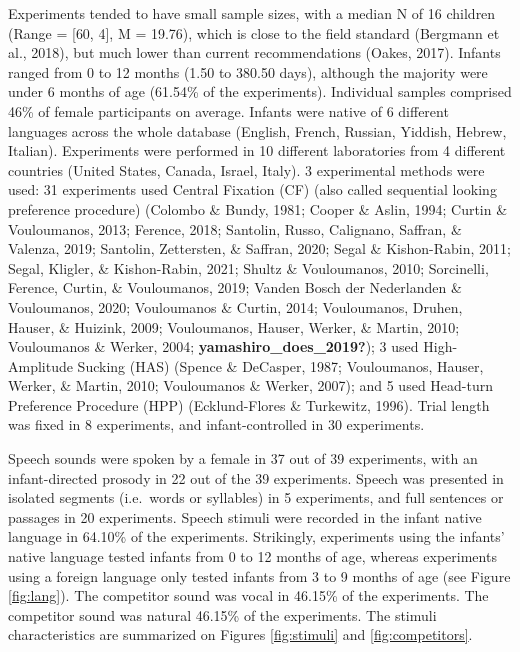 \documentclass[
  english,
  man]{apa6}
\begin{document}
Experiments tended to have small sample sizes, with a median N of 16 children (Range = {[}60, 4{]}, M = 19.76), which is close to the field standard (Bergmann et al., 2018), but much lower than current recommendations (Oakes, 2017). Infants ranged from 0 to 12 months (1.50 to 380.50 days), although the majority were under 6 months of age (61.54\% of the experiments). Individual samples comprised 46\% of female participants on average. Infants were native of 6 different languages across the whole database (English, French, Russian, Yiddish, Hebrew, Italian).
Experiments were performed in 10 different laboratories from 4 different countries (United States, Canada, Israel, Italy). 3 experimental methods were used: 31 experiments used Central Fixation (CF) (also called sequential looking preference procedure) (Colombo \& Bundy, 1981; Cooper \& Aslin, 1994; Curtin \& Vouloumanos, 2013; Ference, 2018; Santolin, Russo, Calignano, Saffran, \& Valenza, 2019; Santolin, Zettersten, \& Saffran, 2020; Segal \& Kishon-Rabin, 2011; Segal, Kligler, \& Kishon-Rabin, 2021; Shultz \& Vouloumanos, 2010; Sorcinelli, Ference, Curtin, \& Vouloumanos, 2019; Vanden Bosch der Nederlanden \& Vouloumanos, 2020; Vouloumanos \& Curtin, 2014; Vouloumanos, Druhen, Hauser, \& Huizink, 2009; Vouloumanos, Hauser, Werker, \& Martin, 2010; Vouloumanos \& Werker, 2004; \textbf{yamashiro\_does\_2019?}); 3 used High-Amplitude Sucking (HAS) (Spence \& DeCasper, 1987; Vouloumanos, Hauser, Werker, \& Martin, 2010; Vouloumanos \& Werker, 2007); and 5 used Head-turn Preference Procedure (HPP) (Ecklund-Flores \& Turkewitz, 1996). Trial length was fixed in 8 experiments, and infant-controlled in 30 experiments.

Speech sounds were spoken by a female in 37 out of 39 experiments, with an infant-directed prosody in 22 out of the 39 experiments. Speech was presented in isolated segments (i.e.~words or syllables) in 5 experiments, and full sentences or passages in 20 experiments. Speech stimuli were recorded in the infant native language in 64.10\% of the experiments. Strikingly, experiments using the infants' native language tested infants from 0 to 12 months of age, whereas experiments using a foreign language only tested infants from 3 to 9 months of age (see Figure \ref{fig:lang}).
The competitor sound was vocal in 46.15\% of the experiments. The competitor sound was natural 46.15\% of the experiments.
The stimuli characteristics are summarized on Figures \ref{fig:stimuli} and \ref{fig:competitors}.
\end{document}
